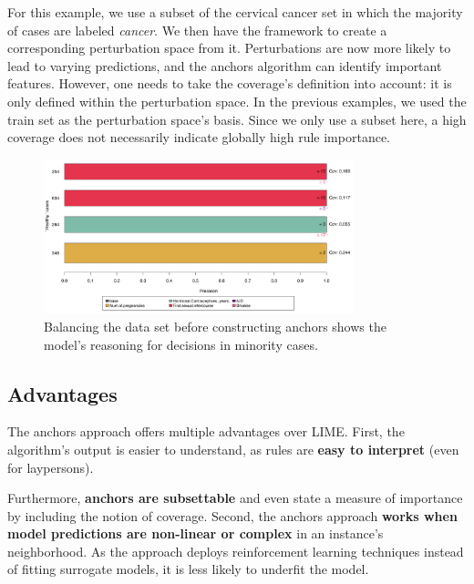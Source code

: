 \documentclass[
  11pt,
]{scrbook}
\begin{document}
For this example, we use a subset of the cervical cancer set in which the majority of cases are labeled \emph{cancer}. We then have the framework to create a corresponding perturbation space from it. Perturbations are now more likely to lead to varying predictions, and the anchors algorithm can identify important features. However, one needs to take the coverage's definition into account: it is only defined within the perturbation space. In the previous examples, we used the train set as the perturbation space's basis. Since we only use a subset here, a high coverage does not necessarily indicate globally high rule importance.

\begin{figure}

{\centering \includegraphics[width=0.8\textwidth]{images/unnamed-chunk-38-1} 

}

\caption{Balancing the data set before constructing anchors shows the model's reasoning for decisions in minority cases.}\label{fig:unnamed-chunk-38}
\end{figure}

\hypertarget{advantages-15}{%
\subsection{Advantages}\label{advantages-15}}

The anchors approach offers multiple advantages over LIME. First, the algorithm's output is easier to understand, as rules are \textbf{easy to interpret} (even for laypersons).

Furthermore, \textbf{anchors are subsettable} and even state a measure of importance by including the notion of coverage.
Second, the anchors approach \textbf{works when model predictions are non-linear or complex} in an instance's neighborhood. As the approach deploys reinforcement learning techniques instead of fitting surrogate models, it is less likely to underfit the model.
\end{document}
